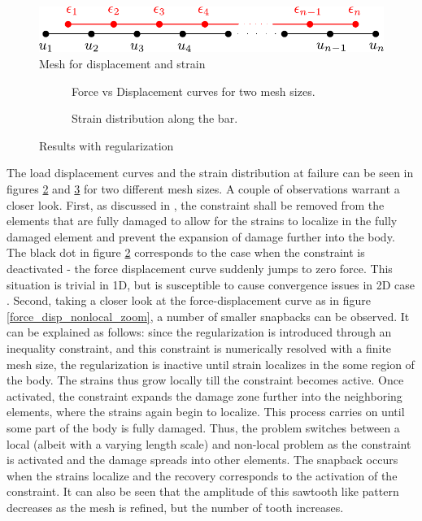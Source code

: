 \documentclass[11pt]{elsarticle}
\begin{document}
\begin{figure}[ht]
	\centering
	\includegraphics[width=0.5\linewidth]{./mesh_dual_1d.pdf}
	\caption{Mesh for displacement and strain}
	\label{mesh_dual_1d}
\end{figure}



\begin{figure}[ht]
	\begin{subfigure}{0.45\textwidth}
		\centering
		
		\caption{Force vs Displacement curves for two mesh sizes.}
		\label{force_disp_nonlocal}
	\end{subfigure}
	\hfill
	\begin{subfigure}{0.45\textwidth}
		\centering
		
		\caption{Strain distribution along the bar.}
		\label{strain_dist_nonlocal}
	\end{subfigure}
	\caption{Results with regularization}
	\label{fig:Results_with_regularization}
\end{figure}

The load displacement curves and the strain distribution at failure can be seen in figures \ref{force_disp_nonlocal} and \ref{strain_dist_nonlocal} for two different mesh sizes. A couple of observations warrant a closer look. First, as discussed in \cite{Kamasamudram2023s}, the constraint shall be removed from the elements that are fully damaged to allow for the strains to localize in the fully damaged element and prevent the expansion of damage further into the body. The black dot in figure \ref{force_disp_nonlocal} corresponds to the case when the constraint is deactivated - the force displacement curve suddenly jumps to zero force. This situation is trivial in 1D, but is susceptible to cause convergence issues in 2D case \cite{geersarticle}. Second, taking a closer look at the force-displacement curve as in figure \ref{force_disp_nonlocal_zoom}, a number of smaller snapbacks can be observed. It can be explained as follows: since the regularization is introduced through an inequality constraint, and this constraint is numerically resolved with a finite mesh size, the regularization is inactive until strain localizes in the some region of the body. The strains thus grow locally till the constraint becomes active. Once activated, the constraint expands the damage zone further into the neighboring elements, where the strains again begin to localize. This process carries on until some part of the body is fully damaged. Thus, the problem switches between a local (albeit with a varying length scale) and non-local problem as the constraint is activated and the damage spreads into other elements. The snapback occurs when the strains localize and the recovery corresponds to the activation of the constraint. It can also be seen that the amplitude of this sawtooth like pattern decreases as the mesh is refined, but the number of tooth increases.
\end{document}
